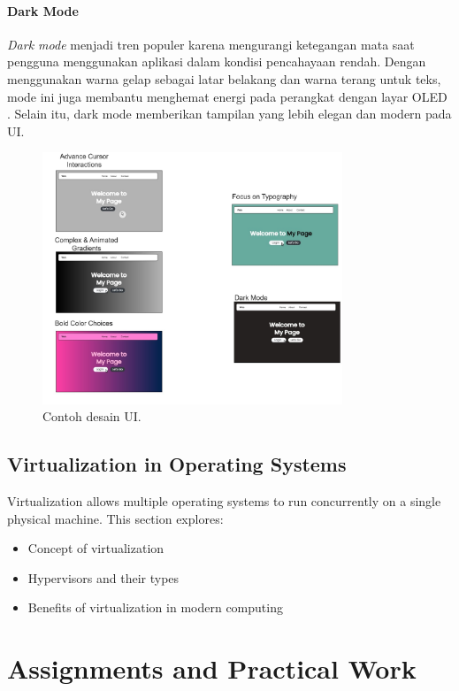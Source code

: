 \documentclass[12pt]{article}
\begin{document}
\paragraph{Dark Mode}
\textit{Dark mode} menjadi tren populer karena mengurangi ketegangan mata saat pengguna menggunakan aplikasi dalam kondisi pencahayaan rendah. Dengan menggunakan warna gelap sebagai latar belakang dan warna terang untuk teks, mode ini juga membantu menghemat energi pada perangkat dengan layar OLED \cite{ricker2021}. Selain itu, dark mode memberikan tampilan yang lebih elegan dan modern pada UI.
\begin{figure}[h]
    \centering
    \includegraphics[width=0.8\textwidth]{asset/ContohUI.drawio (1).jpg}
    \caption{Contoh desain UI.}
    \label{fig:contoh_ui}
\end{figure}

\subsection{Virtualization in Operating Systems}
Virtualization allows multiple operating systems to run concurrently on a single physical machine. This section explores:
\begin{itemize}
    \item Concept of virtualization
    \item Hypervisors and their types
    \item Benefits of virtualization in modern computing
\end{itemize}

\section{Assignments and Practical Work}
\end{document}

